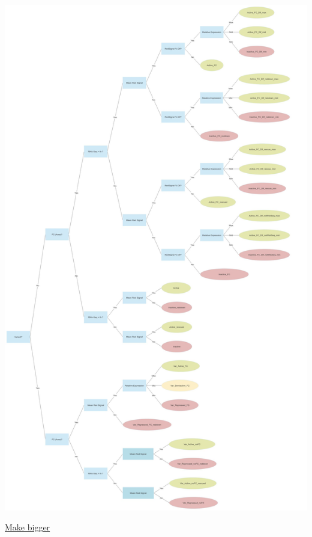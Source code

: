 \documentclass[11pt]{article}
\begin{document}
\begin{center}
\includegraphics[width=.9\linewidth]{./Plots/Decision_Tree.jpg}
\end{center}

\href{./Plots/Decision\_Tree.jpg}{Make bigger}
\end{document}
